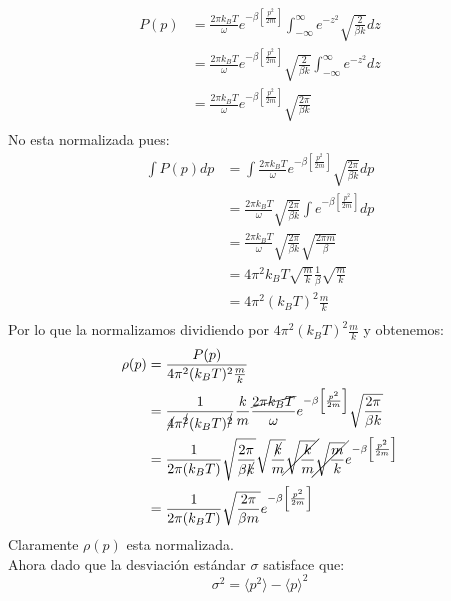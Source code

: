 \documentclass[a4paper]{article}
\begin{document}
\begin{answer}
        \begin{align*}
            P(p) &= \frac{2 \pi k_B T}{\omega} e^{-\beta\left[\frac{p^2}{2 m}\right]} \int_{-\infty}^{\infty} e^{-z^2} \sqrt{ \frac{2}{\beta k}} dz \\
            &= \frac{2 \pi k_B T}{\omega} e^{-\beta\left[\frac{p^2}{2 m}\right]} \sqrt{\frac{2}{\beta k}}  \int_{-\infty}^{\infty} e^{-z^2} dz \\
            &= \frac{2 \pi k_B T}{\omega} e^{-\beta\left[\frac{p^2}{2 m}\right]} \sqrt{\frac{2\pi}{\beta k}}  \\
        \end{align*}
        No esta normalizada pues:
        \begin{align*}
            \int P(p) dp &= \int \frac{2 \pi k_B T}{\omega} e^{-\beta\left[\frac{p^2}{2 m}\right]} \sqrt{\frac{2\pi}{\beta k}}  dp \\
            &= \frac{2 \pi k_B T}{\omega} \sqrt{\frac{2\pi}{\beta k}}  \int e^{-\beta\left[\frac{p^2}{2 m}\right]} dp \\
            &= \frac{2 \pi k_B T}{\omega} \sqrt{\frac{2\pi}{\beta k}}  \sqrt{\frac{2 \pi m}{\beta}} \\
            &= 4 \pi^2 k_B T \sqrt{\frac mk} \frac 1\beta \sqrt{\frac mk}\\
            &= 4 \pi^2 (k_B T)^2 \frac mk \\
        \end{align*}
        Por lo que la normalizamos dividiendo por $4 \pi^2 (k_B T)^2 \frac mk$ y obtenemos:
        \begin{align*}
            \rho(p) &= \frac{P(p)}{4 \pi^2 (k_B T)^2 \frac mk} \\
            &=\frac{1}{\cancel 4 \pi^{\cancel 2} (k_B T)^{\cancel 2}}\frac{k}{m} \frac{\cancel {2\pi k_B T}}{\omega} e^{-\beta\left[\frac{p^2}{2 m}\right]} \sqrt{\frac{2 \pi}{\beta k}} \\
            &= \frac{1}{2 \pi (k_B T)} \sqrt{\frac{2\pi}{\beta \cancel k}} \sqrt{\frac {\cancel k}m} \cancel{\sqrt{\frac km}} \cancel{\sqrt{\frac mk}} e^{-\beta\left[\frac{p^2}{2 m}\right]} \\
            &= \frac{1}{2 \pi (k_B T)} \sqrt{\frac{2\pi}{\beta m}} e^{-\beta\left[\frac{p^2}{2 m}\right]}\\
        \end{align*}
        Claramente $\rho(p)$ esta normalizada.\\
        Ahora dado que la desviación estándar $\sigma$ satisface que:
        $$
        \sigma^2 =\langle p^2\rangle -\langle p\rangle^2
$$
\end{answer}
\end{document}
